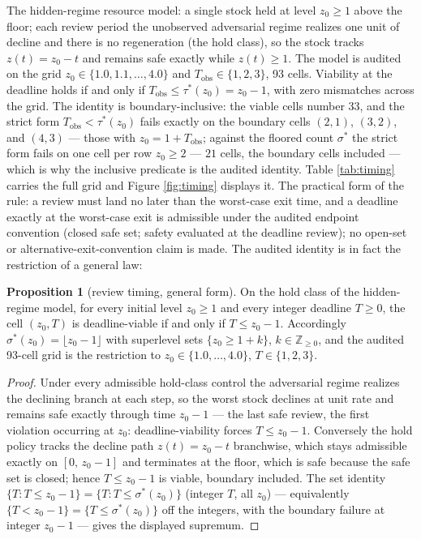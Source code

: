 \documentclass[10pt,twocolumn]{article}
\theoremstyle{definition}
\newtheorem{proposition}{Proposition}
\begin{document}
The hidden-regime resource model: a single stock held at level
\(z_0 \ge 1\) above the floor; each review period the unobserved
adversarial regime realizes one unit of decline and there is no
regeneration (the hold class), so the stock tracks \(z(t) = z_0 - t\)
and remains safe exactly while \(z(t) \ge 1\). The model is audited on
the grid \(z_0 \in \{1.0, 1.1, \dots, 4.0\}\) and
\(T_{\mathrm{obs}} \in \{1, 2, 3\}\), 93 cells. Viability at the
deadline holds if and only if
\(T_{\mathrm{obs}} \le \tau^{*}(z_0) = z_0 - 1\), with zero
mismatches across the grid. The identity is boundary-inclusive: the
viable cells number \(33\), and the strict form \(T_{\mathrm{obs}} <
\tau^{*}(z_0)\) fails exactly on the boundary cells \((2,1)\),
\((3,2)\), and \((4,3)\) --- those with \(z_0 = 1 +
T_{\mathrm{obs}}\); against the floored count \(\sigma^{*}\) the
strict form fails on one cell per row \(z_0 \ge 2\) --- \(21\) cells,
the boundary cells included --- which is why the
inclusive predicate is the audited identity.
Table \ref{tab:timing} carries the full grid and Figure
\ref{fig:timing} displays it. The practical form of the rule: a review
must land no later than the worst-case exit time, and a deadline exactly at the worst-case exit is admissible under the audited endpoint convention (closed safe set; safety evaluated at the deadline review); no open-set or alternative-exit-convention claim is made. The audited identity is in fact the
restriction of a general law:

\begin{proposition}[review timing, general form]\label{prop:timing}
On the hold class of the hidden-regime model, for every initial level
\(z_0 \ge 1\) and every integer deadline \(T \ge 0\), the cell
\((z_0, T)\) is deadline-viable if and only if \(T \le z_0 - 1\).
Accordingly \(\sigma^{*}(z_0) = \lfloor z_0 - 1 \rfloor\) with
superlevel sets \(\{z_0 \ge 1 + k\}\), \(k \in
\mathbb{Z}_{\ge 0}\), and the audited 93-cell grid is the restriction
to \(z_0 \in \{1.0, \dots, 4.0\}\), \(T \in \{1, 2, 3\}\).
\end{proposition}

\begin{proof}
Under every admissible hold-class control the adversarial regime realizes
the declining branch at each step, so the worst stock declines at unit
rate and remains safe exactly through time \(z_0 - 1\) --- the last
safe review, the first violation occurring at \(z_0\):
deadline-viability forces \(T \le z_0 - 1\). Conversely
the hold policy tracks the decline path \(z(t) = z_0 - t\) branchwise,
which stays admissible exactly on \([0,\, z_0 - 1]\) and terminates at
the floor, which is safe because the safe set is closed; hence
\(T \le z_0 - 1\) is viable, boundary included. The set identity
\(\{T : T \le z_0 - 1\} = \{T : T \le \sigma^{*}(z_0)\}\)
(integer \(T\), all \(z_0\)) --- equivalently \(\{T < z_0 - 1\} =
\{T \le \sigma^{*}(z_0)\}\) off the integers, with the boundary
failure at integer \(z_0 - 1\) --- gives the displayed supremum.
\end{proof}
\end{document}
